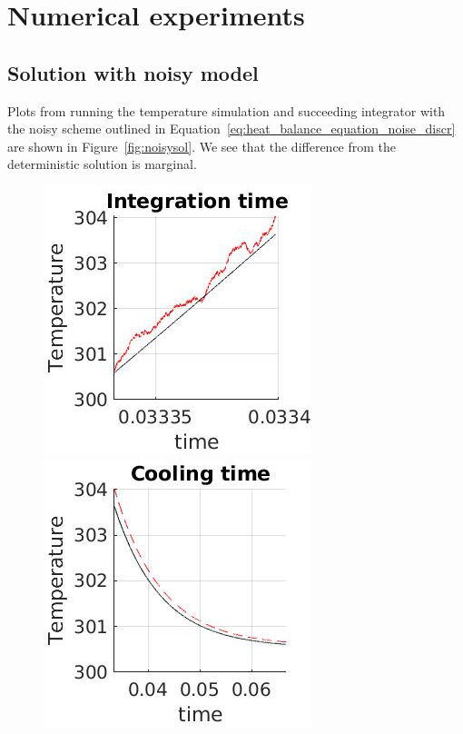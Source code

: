 \section{Numerical experiments}
\subsection{Solution with noisy model}
Plots from running the temperature simulation and succeeding integrator with the noisy scheme outlined in Equation~\eqref{eq:heat_balance_equation_noise_discr} are shown
in Figure~\ref{fig:noisysol}. We see that the difference from the deterministic solution is marginal. 
\begin{figure}
 \begin{center}
\includegraphics[scale=0.35]{gfx/int_time.jpg} 
\includegraphics[scale=0.35]{gfx/cooling.jpg}

\end{center}
\end{figure}
